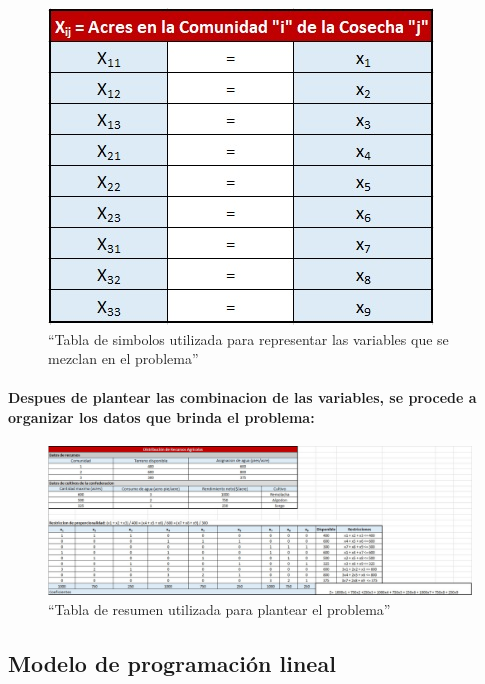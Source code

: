 \documentclass[
]{article}
\begin{document}
\begin{figure}
\centering
\includegraphics{symbols.jpeg}
\caption{``Tabla de simbolos utilizada para representar las variables
que se mezclan en el problema''}
\end{figure}

\hypertarget{despues-de-plantear-las-combinacion-de-las-variables-se-procede-a-organizar-los-datos-que-brinda-el-problema}{%
\paragraph{Despues de plantear las combinacion de las variables, se
procede a organizar los datos que brinda el
problema:}\label{despues-de-plantear-las-combinacion-de-las-variables-se-procede-a-organizar-los-datos-que-brinda-el-problema}}

\begin{figure}
\centering
\includegraphics{img1.jpeg}
\caption{``Tabla de resumen utilizada para plantear el problema''}
\end{figure}

\hypertarget{modelo-de-programaciuxf3n-lineal-1}{%
\subsection{Modelo de programación
lineal}\label{modelo-de-programaciuxf3n-lineal-1}}
\end{document}
